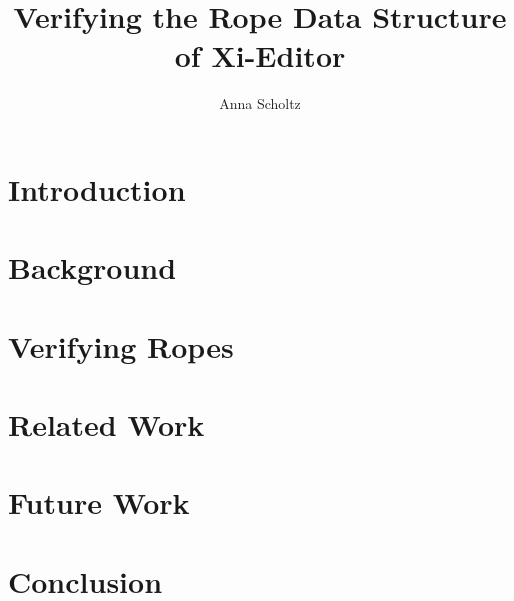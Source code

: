 \documentclass[sigconf]{acmart}
\begin{document}
\title{Verifying the Rope Data Structure of Xi-Editor}


\author{Anna Scholtz}



\begin{abstract}

\end{abstract}





\maketitle

\section{Introduction}
\label{sec:introduction}


\section{Background}
\label{sec:background}


\section{Verifying Ropes}
\label{sec:verification}



\section{Related Work}
\label{sec:related-work}


\section{Future Work}
\label{sec:future-work}



\section{Conclusion}
\label{sec:conclusion}




\end{document}
